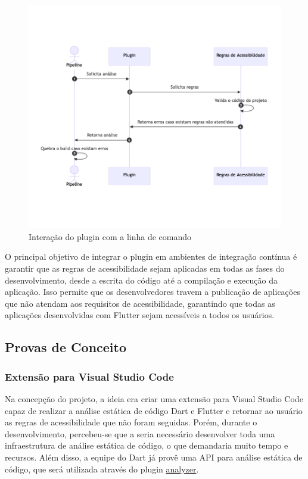 \begin{figure}[!ht]
	\centering
	\caption{Interação do plugin com a linha de comando}\label{fig:diagrama-sequencia-linha-comando}
	\includegraphics[width=325pt]{Assets/DiagramaSequenciaLinhaComando.png}
\end{figure}

O principal objetivo de integrar o plugin em ambientes de integração contínua é garantir que as regras de acessibilidade sejam aplicadas em todas as fases do desenvolvimento, desde a escrita do código até a compilação e execução da aplicação. Isso permite que os desenvolvedores travem a publicação de aplicações que não atendam aos requisitos de acessibilidade, garantindo que todas as aplicações desenvolvidas com Flutter sejam acessíveis a todos os usuários.

\subsection{Provas de Conceito}

\subsubsection{Extensão para Visual Studio Code}

Na concepção do projeto, a ideia era criar uma extensão para Visual Studio Code capaz de realizar a análise estática de código Dart e Flutter e retornar ao usuário as regras de acessibilidade que não foram seguidas. Porém, durante o desenvolvimento, percebeu-se que a seria necessário desenvolver toda uma infraestrutura de análise estática de código, o que demandaria muito tempo e recursos. Além disso, a equipe do Dart já provê uma API para análise estática de código, que será utilizada através do plugin \href{https://pub.dev/packages/analyzer}{analyzer}. 

